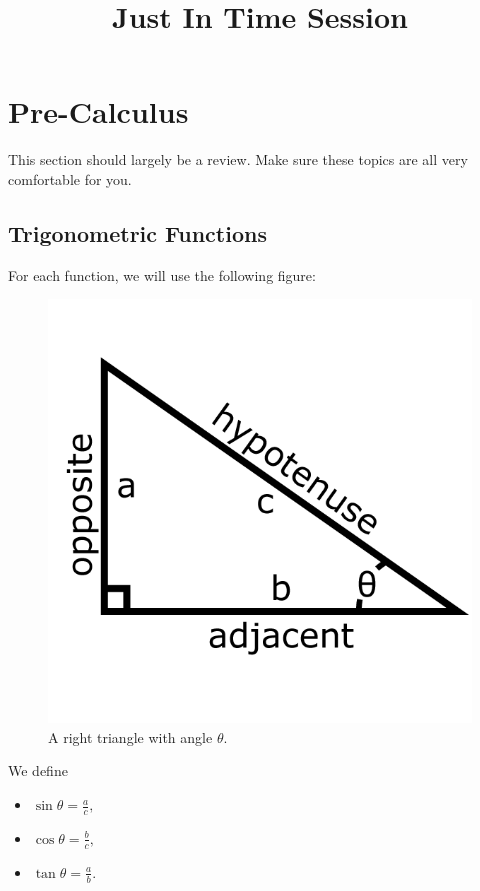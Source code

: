 \documentclass[12pt]{article}
\theoremstyle{definition}
\begin{document}
 
\title{Just In Time Session}
\maketitle


\section{Pre-Calculus}

This section should largely be a review.  Make sure these topics are all very comfortable for you.

\subsection{Trigonometric Functions}

For each function, we will use the following figure:
\begin{figure}[h]
    \centering
    \includegraphics[scale=0.2]{right_triangle.png}
    \caption{A right triangle with angle $\theta$.}
    \label{fig:right_triangle}
\end{figure}

We define
\begin{itemize}
    \item $\sin \theta = \frac{a}{c},$
    \item $\cos \theta = \frac{b}{c},$
    \item $\tan \theta = \frac{a}{b}$.
\end{itemize}
\end{document}
